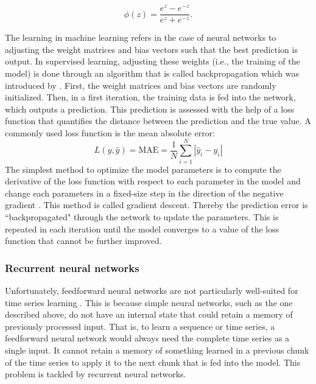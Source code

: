 \begin{equation} \label{Eq:activation}
    \phi(z)=\frac{e^z-e^{-z}}{e^z+e^{-z}}.
\end{equation}

The learning in machine learning refers in the case of neural networks to adjusting the weight matrices and bias vectors such that the best prediction is output. In supervised learning, adjusting these weights (i.e., the training of the model) is done through an algorithm that is called backpropagation which was introduced by \citet{Rumelhart:1986}. First, the weight matrices and bias vectors are randomly initialized. Then, in a first iteration, the training data is fed into the network, which outputs a prediction. This prediction is assessed with the help of a loss function that quantifies the distance between the prediction and the true value. A commonly used loss function is the mean absolute error:
%
\begin{equation} \label{Eq:lossMAE}
    L\left(y, \widehat{y}\right)=\text{MAE}=\frac{1}{N}\sum_{i=1}^N\left|\widehat{y}_i-y_i\right|
\end{equation}
%
The simplest method to optimize the model parameters is to compute the derivative of the loss function with respect to each parameter in the model and change each parameters in a fixed-size step in the direction of the negative gradient \citep{Graves:2013}. This method is called gradient descent. Thereby the prediction error is ``backpropagated" through the network to update the parameters. This is repeated in each iteration until the model converges to a value of the loss function that cannot be further improved.



\subsubsection{Recurrent neural networks}

Unfortunately, feedforward neural networks are not particularly well-suited for time series learning \citep{chollet:2018}. This is because simple neural networks, such as the one described above, do not have an internal state that could retain a memory of previously processed input. That is, to learn a sequence or time series, a feedforward neural network would always need the complete time series as a single input. It cannot retain a memory of something learned in a previous chunk of the time series to apply it to the next chunk that is fed into the model. This problem is tackled by recurrent neural networks.

